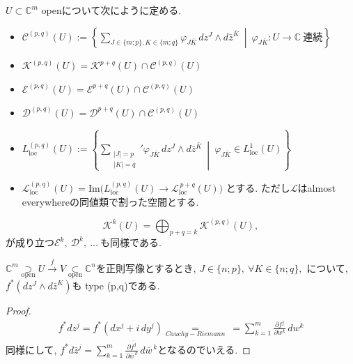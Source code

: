 \begin{tcolorbox}[mybox]
\begin{defn}
\(U \subset \mathbb{C}^m\) openについて次にように定める.
\begin{itemize}
\item 
$\mathcal{C}^{(p,q)}(U)
:=
\left\{
\sum_{J\in \{m;p\},  K\in \{m;q\}}
\varphi_{J\bar{K}}\, dz^J\wedge d\bar{z}^{\bar{K}}
\ \middle|\
\varphi_{J\bar{K}} : U \to \mathbb{C}\ \text{連続}
\right\}$
\item $\mathcal{K}^{(p,q)}(U)=\mathcal{K}^{p+q}(U)\cap \mathcal{C}^{(p,q)}(U)$
\item $\mathcal{E}^{(p,q)}(U)=\mathcal{E}^{p+q}(U)\cap \mathcal{C}^{(p,q)}(U)$
\item $\mathcal{D}^{(p,q)}(U)=\mathcal{D}^{p+q}(U)\cap \mathcal{C}^{(p,q)}(U)$
\item 
$L^{(p,q)}_{\mathrm{loc}}(U):=
\left\{
\sum_{\substack{|J|=p\\|K|=q}}'
\varphi_{J\bar{K}}\,dz^J\wedge d\bar{z}^{\bar{K}}
\ \middle|\
\varphi_{J\bar{K}}\in L^1_{\mathrm{loc}}(U)
\right\}
$
\item 
$\mathcal{L}^{(p,q)}_{\mathrm{loc}}(U)
=
\mathrm{Im}\bigl(L^{(p,q)}_{\mathrm{loc}}(U)\to \mathcal{L}^{\,p+q}_{\mathrm{loc}}(U)\bigr)
$
とする. ただし$\mathcal{L}$はalmost everywhereの同値類で割った空間とする. 
\end{itemize}
\end{defn}
\end{tcolorbox}

\begin{rem}
\label{rem-M-4.3}
\[
\mathcal{K}^{k}(U)=\bigoplus_{p+q=k}\mathcal{K}^{(p,q)}(U),
\]
が成り立つ$\mathcal{E}^k,\ \mathcal{D}^k,\ \ldots\ $も同様である. 
\end{rem}

\begin{tcolorbox}[mybox]
\begin{lem}
\label{lem-M-4.4}
\(\mathbb{C}^m \underset{\text{open}}{\supset} U \xrightarrow{\,f\,} V 
 \underset{\text{open}}{\subset} \mathbb{C}^n\)を正則写像とするとき, 
 \( J\in \{n;p\},\ \forall K\in \{n;q\},\)
について, 
\(
f^{*}(dz^{J}\wedge d\bar{z}^{K}) 
\)も type (p,q)である. 
\end{lem}
\end{tcolorbox}

\begin{proof}
\begin{align*}
f^{*}dz^{j}=f^{*}(dx^{j}+i\,dy^{j}) \underset{Cauchy-Riemann}{=}\
=\sum_{k=1}^{m}\frac{\partial f^{j}}{\partial w^{k}}\,dw^{k}
\end{align*}
同様にして, 
$
f^{*}d\bar{z}^{j}=
\sum_{k=1}^{m}\frac{\partial \overline{f^{j}}}{\partial \overline{w}^{\,k}}\,d\overline{w}^{\,k}$となるのでいえる. 
\end{proof}

